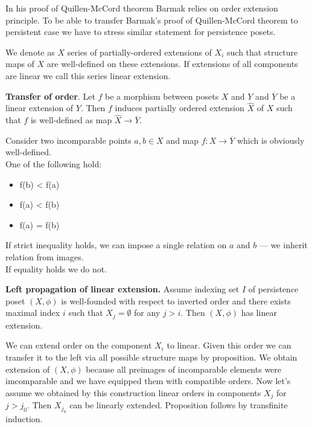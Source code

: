 In his proof of Quillen-McCord theorem Barmak relies on order extension principle. To be able to transfer Barmak's proof of Quillen-McCord theorem to persistent case we have to stress similar statement for persistence posets.

\begin{definition}
  We denote as  $X$ series of partially-ordered extensions of $X_i$ such that structure maps of $X$ are well-defined on these extensions. If extensions of all components are linear we call this series linear extension.
\end{definition}

\begin{proposition}
  \textbf{Transfer of order}. Let $f$ be a morphism between posets $X$ and $Y$ and $\overline{Y}$ be a linear extension of $Y$. Then $f$ induces partially ordered extension $\hat{X}$ of $X$ such that $f$ is well-defined as map $\hat{X} \to \overline{Y}$.
\end{proposition}

\begin{pf}
  Consider two incomparable points $a, b \in X$ and map $f : X \to \overline{Y}$ which is obviously well-defined.\\
  One of the following hold:\\
  \begin{itemize}
    \item f(b) < f(a)
    \item f(a) < f(b)
    \item f(a) = f(b)
  \end{itemize}
  If strict inequality holds, we can impose a single relation on $a$ and $b$ --- we inherit relation from images.\\
  If equality holds we do not.
\end{pf}

\begin{proposition}
  \textbf{Left propagation of linear extension.} Assume indexing set $I$ of persistence poset $(X,\phi)$ is well-founded with respect to inverted order and there exists maximal index $i$ such that $X_j = \emptyset$ for any $j > i$. Then $(X,\phi)$ has linear extension.
\end{proposition}

\begin{pf}
  We can extend order on the component $X_i$ to linear. Given this order we can transfer it to the left via all possible structure maps by proposition. We obtain extension of $(X,\phi)$ because all preimages of incomparable elements were imcomparable and we have equipped them with compatible orders. Now let's assume we obtained by this construction linear orders in components $X_j$ for $j > j_0$. Then $X_{j_0}$ can be linearly extended. Proposition follows by transfinite induction.
\end{pf}

